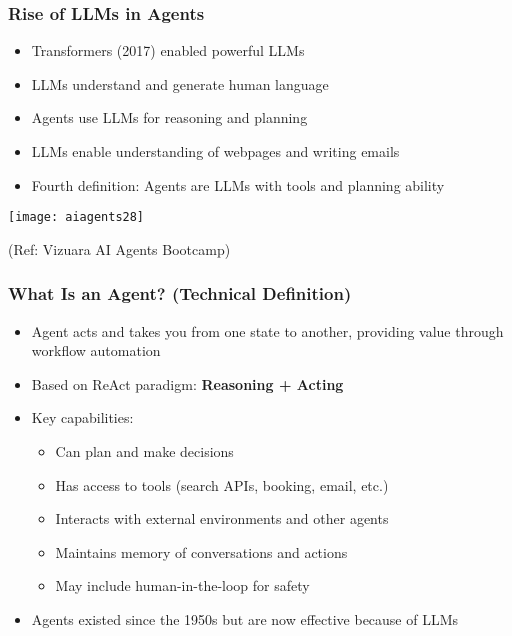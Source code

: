 \begin{frame}[fragile]\frametitle{Rise of LLMs in Agents}

      \begin{itemize}
        \item Transformers (2017) enabled powerful LLMs
        \item LLMs understand and generate human language
        \item Agents use LLMs for reasoning and planning
        \item LLMs enable understanding of webpages and writing emails
        \item Fourth definition: Agents are LLMs with tools and planning ability
      \end{itemize}

		\begin{center}
		\texttt{[image: aiagents28]}
		
		{\tiny (Ref: Vizuara AI Agents Bootcamp)}
		\end{center}	

\end{frame}



\begin{frame}[fragile]\frametitle{What Is an Agent? (Technical Definition)}
\begin{itemize}
    \item Agent acts and takes you from one state to another, providing value through workflow automation
    \item Based on ReAct paradigm: \textbf{Reasoning + Acting}
    \item Key capabilities:
    \begin{itemize}
        \item Can plan and make decisions
        \item Has access to tools (search APIs, booking, email, etc.)
        \item Interacts with external environments and other agents
        \item Maintains memory of conversations and actions
        \item May include human-in-the-loop for safety
    \end{itemize}
    \item Agents existed since the 1950s but are now effective because of LLMs
\end{itemize}
\end{frame}


